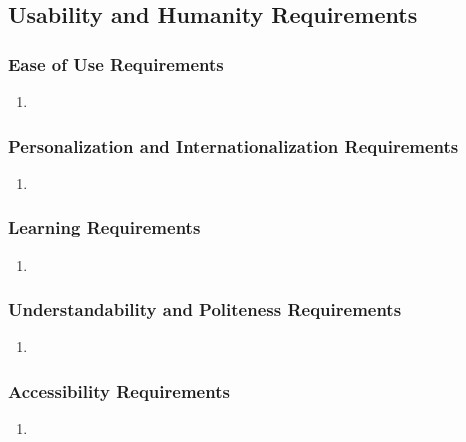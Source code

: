 \documentclass[]{article}
\begin{document}

\subsection{Usability and Humanity Requirements}
\label{sub:usability_and_humanity_requirements}

\subsubsection{Ease of Use Requirements}
\label{ssub:ease_of_use_requirements}
\begin{enumerate}[{UH-EOU}1. ]
	\item 
\end{enumerate}

\subsubsection{Personalization and Internationalization Requirements}
\label{ssub:personalization_and_internationalization_requirements}
\begin{enumerate}[{UH-PI}1. ]
	\item 
\end{enumerate}

\subsubsection{Learning Requirements}
\label{ssub:learning_requirements}
\begin{enumerate}[{UH-L}1. ]
	\item 
\end{enumerate}

\subsubsection{Understandability and Politeness Requirements}
\label{ssub:understandability_and_politeness_requirements}
\begin{enumerate}[{UH-UP}1. ]
	\item 
\end{enumerate}

\subsubsection{Accessibility Requirements}
\label{ssub:accessibility_requirements}
\begin{enumerate}[{UH-A}1. ]
	\item 
\end{enumerate}
\end{document}
